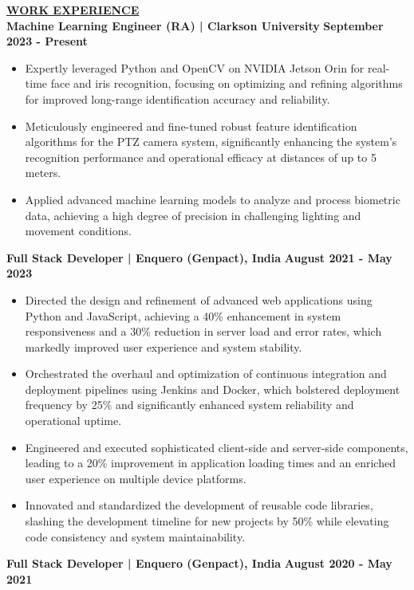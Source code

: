\documentclass{article}
\begin{document}
\noindent \textbf{\underline{WORK EXPERIENCE}}\\
\noindent \textbf{Machine Learning Engineer (RA) | Clarkson University} \hfill \textbf{September 2023 - Present}
\begin{itemize}[noitemsep,nolistsep,leftmargin=*]
\item {\small Expertly leveraged Python and OpenCV on NVIDIA Jetson Orin for real-time face and iris recognition, focusing on optimizing and refining algorithms for improved long-range identification accuracy and reliability.}
\item {\small Meticulously engineered and fine-tuned robust feature identification algorithms for the PTZ camera system, significantly enhancing the system's recognition performance and operational efficacy at distances of up to 5 meters.}
\item {\small Applied advanced machine learning models to analyze and process biometric data, achieving a high degree of precision in challenging lighting and movement conditions.}
\end{itemize}
\vspace{1mm} 
\noindent \textbf{Full Stack Developer | Enquero (Genpact), India} \hfill \textbf{August 2021 - May 2023}
\begin{itemize}[noitemsep,nolistsep,leftmargin=*]
\item {\small Directed the design and refinement of advanced web applications using Python and JavaScript, achieving a 40\% enhancement in system responsiveness and a 30\% reduction in server load and error rates, which markedly improved user experience and system stability.}
\item {\small Orchestrated the overhaul and optimization of continuous integration and deployment pipelines using Jenkins and Docker, which bolstered deployment frequency by 25\% and significantly enhanced system reliability and operational uptime.}
\item {\small Engineered and executed sophisticated client-side and server-side components, leading to a 20\% improvement in application loading times and an enriched user experience on multiple device platforms.}
\item {\small Innovated and standardized the development of reusable code libraries, slashing the development timeline for new projects by 50\% while elevating code consistency and system maintainability.}
\end{itemize}
\vspace{1mm}
\noindent \textbf{Full Stack Developer | Enquero (Genpact), India} \hfill \textbf{August 2020 - May 2021}
\end{document}
